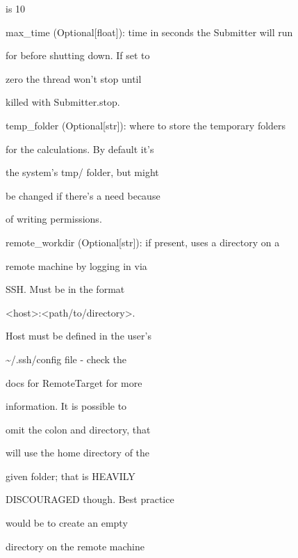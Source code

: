 \documentclass[letterpaper,10pt,english]{sphinxmanual}
\begin{document}
\begin{fulllineitems}
\begin{DUlineblock}{0em}
\begin{DUlineblock}{\DUlineblockindent}
\begin{DUlineblock}{\DUlineblockindent}
\item[] is 10
\end{DUlineblock}
\item[] max\_time (Optional{[}float{]}): time in seconds the Submitter will run
\item[]
\begin{DUlineblock}{\DUlineblockindent}
\item[] for before shutting down. If set to
\item[] zero the thread won't stop until
\item[] killed with Submitter.stop.
\end{DUlineblock}
\item[] temp\_folder (Optional{[}str{]}): where to store the temporary folders
\item[]
\begin{DUlineblock}{\DUlineblockindent}
\item[] for the calculations. By default it's
\item[] the system's tmp/ folder, but might
\item[] be changed if there's a need because
\item[] of writing permissions.
\end{DUlineblock}
\item[] remote\_workdir (Optional{[}str{]}): if present, uses a directory on a
\item[]
\begin{DUlineblock}{\DUlineblockindent}
\item[] remote machine by logging in via
\item[] SSH. Must be in the format
\item[] \textless{}host\textgreater{}:\textless{}path/to/directory\textgreater{}.
\item[] Host must be defined in the user's
\item[] \textasciitilde{}/.ssh/config file - check the
\item[] docs for RemoteTarget for more
\item[] information. It is possible to
\item[] omit the colon and directory, that
\item[] will use the home directory of the
\item[] given folder; that is HEAVILY
\item[] DISCOURAGED though. Best practice
\item[] would be to create an empty
\item[] directory on the remote machine

\end{DUlineblock}
\end{DUlineblock}
\end{DUlineblock}
\end{fulllineitems}
\end{document}
